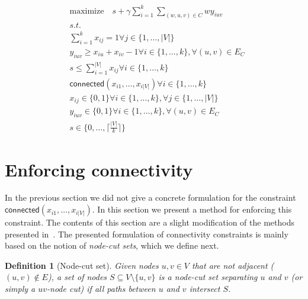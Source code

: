 \documentclass[conference,compsoc]{IEEEtran}
\newtheorem{definition}{Definition}
\begin{document}
\begin{align}
& \text{maximize} \quad s + \gamma \sum_{i=1}^{k} \sum_{(w, u, v) \in C} w  y_{iuv}  \\
&\textit{s.t.}                                                                       \nonumber \\
&\sum_{i=1}^k x_{ij} = 1                                                             \forall j \in \{1, \ldots, |V|\} \\
& y_{iuv} \geq x_{iu} + x_{iv} -1                                                    \forall i \in \{1, \ldots, k\}, \forall (u, v) \in E_{C} \\
& s \leq \sum_{i=1}^{|V|} x_{ij}                                                     \forall i \in \{1, \ldots, k\} \\
& \mathsf{connected}(x_{i1}, \ldots, x_{i|V|})                                       \forall i \in \{1, \ldots, k\} \\
& x_{ij} \in \{0, 1\}                                                                \forall i \in \{1, \ldots, k\}, \forall j \in \{1, \ldots, |V|\} \\
& y_{iuv} \in \{0, 1\}                                                               \forall i \in \{1, \ldots, k\}, \forall (u, v) \in E_{C} \\
& s \in \{0, \ldots, \lceil \frac{|V|}{k} \rceil \}                                  
\end{align}

\section{Enforcing connectivity}
\label{sec:connectivity}

In the previous section we did not give a concrete formulation for the constraint $\mathsf{connected}(x_{i1}, \ldots, x_{i|V|})$. In this section we present a method for enforcing this constraint. The contents of this
section are a slight modification of the methods presented in~\cite{CarvajalCGVW13}. The presented formulation of connectivity constraints is mainly based on the notion of \emph{node-cut sets}, which we define next. 

\begin{definition}[Node-cut set]
Given nodes $u, v \in V$ that are not adjacent ($(u, v) \notin E$), a set of nodes $S \subseteq V \setminus \{u, v\}$ is a \emph{node-cut set} separating $u$ and $v$ (or simply a \emph{$uv$-node cut}) if all paths between $u$ and $v$ intersect $S$.
\end{definition}
\end{document}
